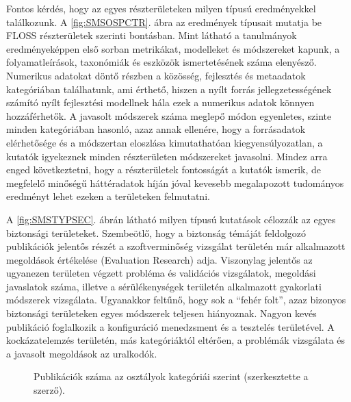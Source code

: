 \documentclass[12pt,magyar,a4paper,oneside]{scrreprt}
\begin{document}
Fontos kérdés, hogy az egyes részterületeken milyen típusú eredményekkel
találkozunk. A \ref{fig:SMSOSPCTR}. ábra az eredmények típusait mutatja
be FLOSS részterületek szerinti bontásban. Mint látható a tanulmányok
eredményeképpen első sorban metrikákat, modelleket és módszereket
kapunk, a folyamatleírások, taxonómiák és eszközök ismertetésének száma
elenyésző. Numerikus adatokat döntő részben a közösség, fejlesztés és
metaadatok kategóriában találhatunk, ami érthető, hiszen a nyílt forrás
jellegzetességének számító nyílt fejlesztési modellnek hála ezek a
numerikus adatok könnyen hozzáférhetők. A javasolt módszerek száma
meglepő módon egyenletes, szinte minden kategóriában hasonló, azaz annak
ellenére, hogy a forrásadatok elérhetősége és a módszertan eloszlása
kimutathatóan kiegyensúlyozatlan, a kutatók igyekeznek minden
részterületen módszereket javasolni. Mindez arra enged következtetni,
hogy a részterületek fontosságát a kutatók ismerik, de megfelelő
minőségű háttéradatok híján jóval kevesebb megalapozott tudományos
eredményt lehet ezeken a területeken felmutatni.

A \ref{fig:SMSTYPSEC}. ábrán látható milyen típusú kutatások célozzák az
egyes biztonsági területeket. Szembeötlő, hogy a biztonság témáját
feldolgozó publikációk jelentős részét a szoftverminőség vizsgálat
területén már alkalmazott megoldások értékelése (Evaluation Research)
adja. Viszonylag jelentős az ugyanezen területen végzett probléma és
validációs vizsgálatok, megoldási javaslatok száma, illetve a
sérülékenységek területén alkalmazott gyakorlati módszerek vizsgálata.
Ugyanakkor feltűnő, hogy sok a ``fehér folt'', azaz bizonyos biztonsági
területeken egyes módszerek teljesen hiányoznak. Nagyon kevés publikáció
foglalkozik a konfiguráció menedzsment és a tesztelés területével. A
kockázatelemzés területén, más kategóriáktól eltérően, a problémák
vizsgálata és a javasolt megoldások az uralkodók.

\begin{figure}
\centering



\caption{Publikációk száma az osztályok kategóriái szerint
(szerkesztette a szerző).}

\label{fig:SMSCategs}

\end{figure}
\end{document}
